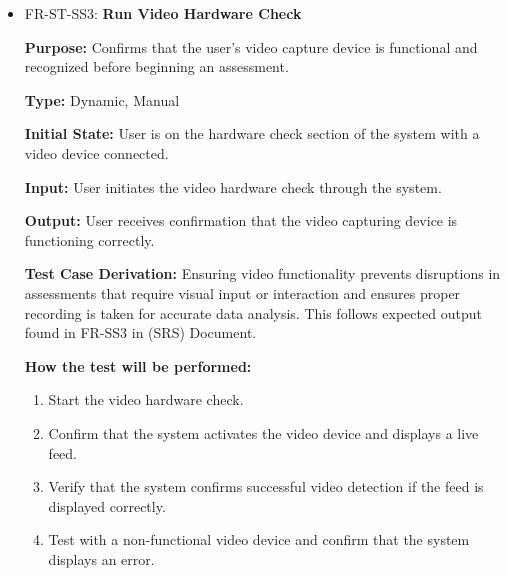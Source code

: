 \documentclass[12pt, titlepage]{article}
\begin{document}
\begin{itemize}
  \item FR-ST-SS3: \textbf{Run Video Hardware Check}
  \begin{mdframed}[linewidth=0.5mm]
      \textbf{Purpose:} Confirms that the user’s video capture device is functional and recognized before beginning an assessment. \par
      \textbf{Type:} Dynamic, Manual \par
      \textbf{Initial State:} User is on the hardware check section of the system with a video device connected. \par
      \textbf{Input:} User initiates the video hardware check through the system. \par
      \textbf{Output:} User receives confirmation that the video capturing device is functioning correctly. \par
      \textbf{Test Case Derivation:} Ensuring video functionality prevents disruptions in assessments that require 
      visual input or interaction and ensures proper recording is taken for accurate data analysis. This follows expected output found in FR-SS3 in (SRS) Document. \par
      \textbf{How the test will be performed:}
      \begin{enumerate}[noitemsep]
        \item Start the video hardware check.
        \item Confirm that the system activates the video device and displays a live feed.
        \item Verify that the system confirms successful video detection if the feed is displayed correctly.
        \item Test with a non-functional video device and confirm that the system displays an error.
      \end{enumerate}
  \end{mdframed}


\end{itemize}
\end{document}
